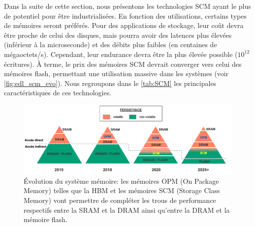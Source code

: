         
        Dans la suite de cette section, nous présentons les technologies SCM ayant le plus de potentiel pour être industrialisées. En fonction des utilisations, certains types de mémoires seront préférés. Pour des applications de stockage, leur coût devra être proche de celui des disques, mais pourra avoir des latences plus élevées (inférieur à la microseconde) et des débits plus faibles (en centaines de mégaoctets/s). Cependant, leur endurance devra être la plus élevée possible ($10^{12}$ écritures). À terme, le prix des mémoires SCM devrait converger vers celui des mémoires flash, permettant une utilisation massive dans les systèmes (voir \autoref{fig:edl_scm_evo}). Nous regroupons dans le \autoref{tab:SCM} les principales caractéristiques de ces technologies.
        
        
        \begin{figure}
        \center
        \includegraphics[width=17cm]{images/edl_scm_evo.png}
        \caption{\label{fig:edl_scm_evo} Évolution du système mémoire: les mémoires OPM (On Package Memory) telles que la HBM et les mémoires SCM (Storage Class Memory) vont permettre de compléter les trous de performance respectifs entre la SRAM et la DRAM ainsi qu'entre la DRAM et la mémoire flash.}
        \end{figure}
        
